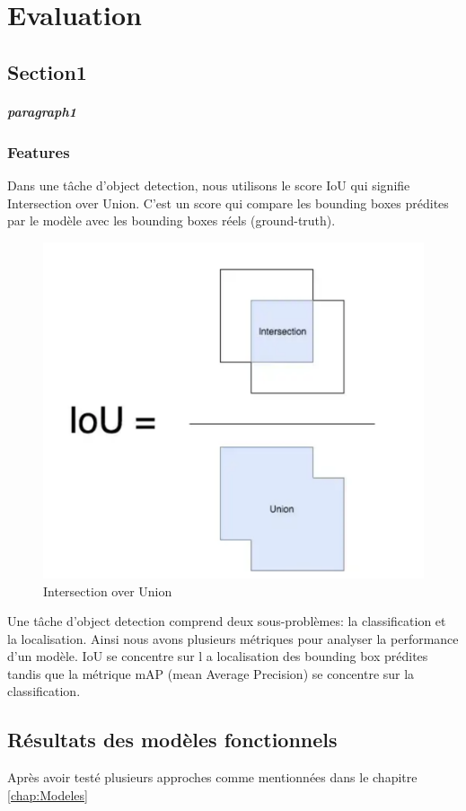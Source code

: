 \chapter{Evaluation}

\section{Section1}
\paragraph{paragraph1}
\subsection{Features}
Dans une tâche d'object detection, nous utilisons le score IoU qui signifie Intersection over Union.
C'est un score qui compare les bounding boxes prédites par le modèle avec les bounding boxes réels (ground-truth).
\begin{figure}[tbh!]
    \centering
    \includegraphics[width=\textwidth]{images/iou.png}
    \caption{Intersection over Union}
    \label{fig:iou}
\end{figure}
Une tâche d'object detection comprend deux sous-problèmes: la classification et la localisation.
Ainsi nous avons plusieurs métriques pour analyser la performance d'un modèle. IoU se concentre sur l
a localisation des bounding box prédites tandis que la métrique mAP (mean Average Precision) 
se concentre sur la classification.





\section{Résultats des modèles fonctionnels}

Après avoir testé plusieurs approches comme mentionnées dans le chapitre \autoref{chap:Modeles}
